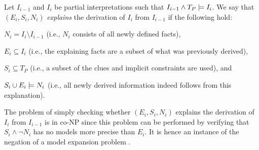 % 



\begin{definition}
 Let $I_{i-1}$ and $I_i$ be partial interpretations such that $I_{i-1}\land T_P \models I_i$.
 We say that $(E_i,S_i,N_i)$ \emph{explains} the derivation of $I_{i}$ from $I_{i-1}$ if the following hold:
\begin{compactitem}
    \item $N_i= I_i \setminus I_{i-1}$ (i.e., $N_i$ consists of all newly defined facts), 
	\item $E_i\subseteq I_i$ (i.e., the explaining facts are a subset of what was previously derived),
	\item $S_i \subseteq T_P$ (i.e., a subset of the clues and implicit constraints are used), and 
	\item $S_i \cup E_i \models N_i$ (i.e., all newly derived information indeed follows from this explanation).
\end{compactitem}
\end{definition}

The problem of simply checking whether $(E_i,S_i,N_i)$ explains the derivation of $I_{i}$ from $I_{i-1}$ is in co-NP since this problem can be performed by verifying that $S_i \land \lnot N_i$ has no models more precise than $E_i$. It is hence an instance of the negation of a model expansion problem \cite{DBLP:conf/lpar/KolokolovaLMT10}.

